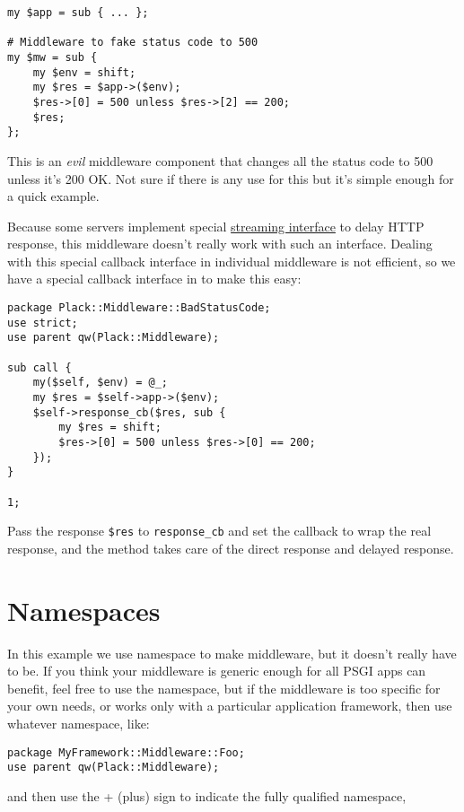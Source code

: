 \begin{lstlisting}
my $app = sub { ... };

# Middleware to fake status code to 500
my $mw = sub {
    my $env = shift;
    my $res = $app->($env);
    $res->[0] = 500 unless $res->[2] == 200;
    $res;
};
\end{lstlisting}

This is an \emph{evil} middleware component that changes all the status
code to 500 unless it's 200 OK. Not sure if there is any use for this
but it's simple enough for a quick example.

Because some servers implement special
\href{http://bulknews.typepad.com/blog/2009/10/psgiplack-streaming-is-now-complete.html}{streaming
interface} to delay HTTP response, this middleware doesn't really work
with such an interface. Dealing with this special callback interface in
individual middleware is not efficient, so we have a special callback
interface in  to make this easy:

\begin{lstlisting}
package Plack::Middleware::BadStatusCode;
use strict;
use parent qw(Plack::Middleware);

sub call {
    my($self, $env) = @_;
    my $res = $self->app->($env);
    $self->response_cb($res, sub {
        my $res = shift;
        $res->[0] = 500 unless $res->[0] == 200;
    });
}

1;
\end{lstlisting}

Pass the response \lstinline!$res! to \lstinline!response_cb! and set
the callback to wrap the real response, and the method takes care of the
direct response and delayed response.

\section{Namespaces}\label{namespaces}

In this example we use  namespace to make middleware,
but it doesn't really have to be. If you think your middleware is
generic enough for all PSGI apps can benefit, feel free to use the
namespace, but if the middleware is too specific for your own needs, or
works only with a particular application framework, then use whatever
namespace, like:

\begin{lstlisting}
package MyFramework::Middleware::Foo;
use parent qw(Plack::Middleware);
\end{lstlisting}
%
and then use the + (plus) sign to indicate the fully qualified
namespace,

